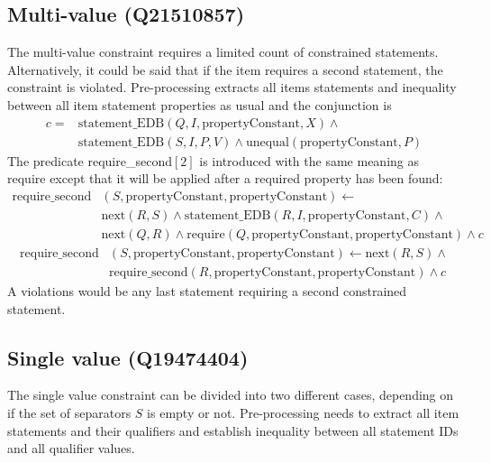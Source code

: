 \documentclass[hyperref,bachelorofscience,fleqn]{cgvpub}
\begin{document}
\subsection{Multi-value (Q21510857)}
The multi-value constraint requires a limited count of constrained statements. Alternatively, it could be said that if the item requires a second statement, the constraint is violated. Pre-processing extracts all items statements and inequality between all item statement properties as usual and the conjunction is 
\begin{equation*}
\begin{split}
c = &\text{statement\_EDB}(Q, I, \text{propertyConstant}, X) \wedge{} \\
&\text{statement\_EDB}(S, I, P, V) \wedge \text{unequal}(\text{propertyConstant}, P)
\end{split}
\end{equation*}
The predicate require\_second\([2]\) is introduced with the same meaning as require except that it will be applied after a required property has been found:
\begin{equation*}
\begin{split}
\text{require\_second}&(S, \text{propertyConstant}, \text{propertyConstant}) \leftarrow \\
&\text{next}(R, S) \wedge \text{statement\_EDB}(R, I, \text{propertyConstant}, C) \wedge{} \\
&\text{next}(Q, R) \wedge \text{require}(Q, \text{propertyConstant}, \text{propertyConstant})  \wedge c
\end{split}
\end{equation*}
\begin{equation*}
\begin{split}
\text{require\_second}&(S, \text{propertyConstant}, \text{propertyConstant}) \leftarrow \text{next}(R, S) \wedge{} \\
&\text{require\_second}(R, \text{propertyConstant}, \text{propertyConstant}) \wedge c
\end{split}
\end{equation*}
A violations would be any last statement requiring a second constrained statement.\\

\subsection{Single value (Q19474404)}\label{subsec_3_single_value}
The single value constraint can be divided into two different cases, depending on if the set of separators \(S\) is empty or not. Pre-processing needs to extract all item statements and their qualifiers and establish inequality between all statement IDs and all qualifier values.
\end{document}
